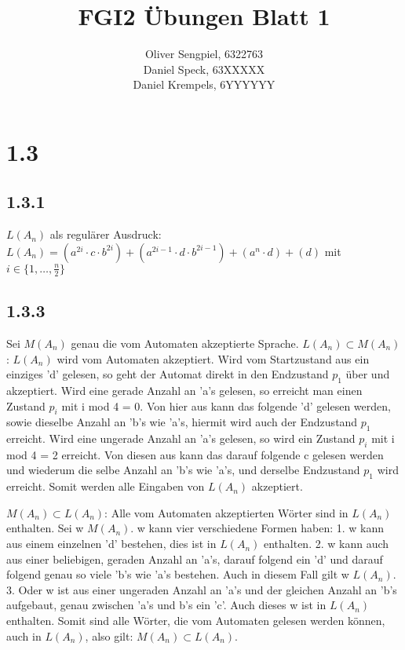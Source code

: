 \documentclass{article}
\title{FGI2 Übungen Blatt 1}
\author{Oliver Sengpiel, 6322763 \\
	Daniel Speck, 63XXXXX \\
	Daniel Krempels, 6YYYYYY}
\begin{document}
\maketitle

\section{1.3}
\subsection{1.3.1}
$L(A_n)$ als regulärer Ausdruck: \\
$L(A_n) = (a^{2i}\cdot c\cdot b^{2i}) + (a^{2i-1}\cdot d\cdot b^{2i-1}) +
(a^{n}\cdot d) + (d)$ mit $i \in \{1, \dots, \frac{n}{2} \}$

\subsection{1.3.3}
Sei $M(A_n)$ genau die vom Automaten akzeptierte Sprache.
$L(A_n) \subset M(A_n)$: $L(A_n)$ wird vom Automaten akzeptiert. Wird vom Startzustand aus ein einziges 'd' gelesen, so geht der Automat direkt in den Endzustand $p_1$ über und akzeptiert. Wird eine gerade Anzahl an 'a's gelesen, so erreicht man einen Zustand $p_i$ mit i mod 4 = 0. Von hier aus kann das folgende 'd' gelesen werden, sowie dieselbe Anzahl an 'b's wie 'a's, hiermit wird auch der Endzustand $p_1$ erreicht. Wird eine ungerade Anzahl an 'a's gelesen, so wird ein Zustand $p_i$ mit i mod 4 = 2 erreicht. Von diesen aus kann das darauf folgende c gelesen werden und wiederum die selbe Anzahl an 'b's wie 'a's, und derselbe Endzustand $p_1$ wird erreicht. Somit werden alle Eingaben von $L(A_n)$ akzeptiert. 

$M(A_n) \subset L(A_n)$: Alle vom Automaten akzeptierten Wörter sind in $L(A_n)$ enthalten. Sei w \in $M(A_n)$. w kann vier verschiedene Formen haben: 1. w kann aus einem einzelnen 'd' bestehen, dies ist in $L(A_n)$ enthalten. 2. w kann auch aus einer beliebigen, geraden Anzahl an 'a's, darauf folgend ein 'd' und darauf folgend genau so viele 'b's wie 'a's bestehen. Auch in diesem Fall gilt w \in $L(A_n)$. 3. Oder w ist aus einer ungeraden Anzahl an 'a's und der gleichen Anzahl an 'b's aufgebaut, genau zwischen 'a's und b's ein 'c'. Auch dieses w ist in $L(A_n)$ enthalten. Somit sind alle Wörter, die vom Automaten gelesen werden können, auch in $L(A_n)$, also gilt: $M(A_n) \subset L(A_n)$. 
\end{document}
